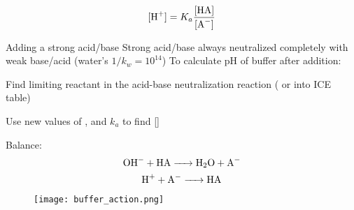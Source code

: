 \begin{mdframed}
\begin{multicols}{2}
\begin{compactdesc}
    \[[\ce{H+}] = K_a \frac{[\ce{HA}]}{[\ce{A^-}]}\]
\item[Adding a strong acid/base]
    Strong acid/base always neutralized completely with weak base/acid (water's
    $1/k_w = 10^{14}$) To calculate pH of buffer after addition:
    \begin{compactenum}
    \item Find limiting reactant in the acid-base neutralization reaction
        ( or  into ICE table)
    \item Use new values of ,  and $k_a$ to find
        []
    \end{compactenum}
    Balance:
    \[\ce{OH^- + HA -> H2O + A^-}\]
    \[\ce{H+ + A^- -> HA}\]
\end{compactdesc}
\begin{figure}[H]
    \centering
    \texttt{[image: buffer\_action.png]}
\end{figure}
\end{multicols}
\end{mdframed}




